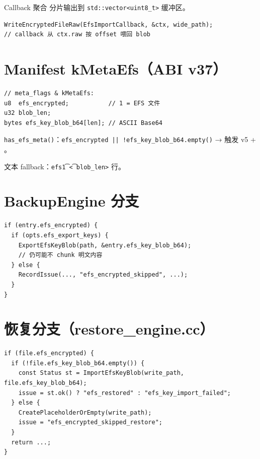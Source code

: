 Callback 聚合  分片输出到 \texttt{std::vector<uint8\_t>} 缓冲区。

\begin{lstlisting}[caption={ImportEfsKeyBlob (efs\_key.cc)}]
WriteEncryptedFileRaw(EfsImportCallback, &ctx, wide_path);
// callback 从 ctx.raw 按 offset 喂回 blob
\end{lstlisting}

\section{Manifest kMetaEfs（ABI v37）}

\begin{lstlisting}[caption={二进制布局 (manifest.cc)}]
// meta_flags & kMetaEfs:
u8  efs_encrypted;           // 1 = EFS 文件
u32 blob_len;
bytes efs_key_blob_b64[len]; // ASCII Base64
\end{lstlisting}

\texttt{has\_efs\_meta()}：\texttt{efs\_encrypted || !efs\_key\_blob\_b64.empty()} → 触发 v5 + 。

文本 fallback：\texttt{efs\t1\t<blob\_len>} 行。

\section{BackupEngine 分支}

\begin{lstlisting}[caption={Backup EFS 决策（概念）}]
if (entry.efs_encrypted) {
  if (opts.efs_export_keys) {
    ExportEfsKeyBlob(path, &entry.efs_key_blob_b64);
    // 仍可能不 chunk 明文内容
  } else {
    RecordIssue(..., "efs_encrypted_skipped", ...);
  }
}
\end{lstlisting}

\section{恢复分支（restore\_engine.cc）}

\begin{lstlisting}[caption={EFS 恢复决策 (restore\_engine.cc)}]
if (file.efs_encrypted) {
  if (!file.efs_key_blob_b64.empty()) {
    const Status st = ImportEfsKeyBlob(write_path, file.efs_key_blob_b64);
    issue = st.ok() ? "efs_restored" : "efs_key_import_failed";
  } else {
    CreatePlaceholderOrEmpty(write_path);
    issue = "efs_encrypted_skipped_restore";
  }
  return ...;
}
\end{lstlisting}

